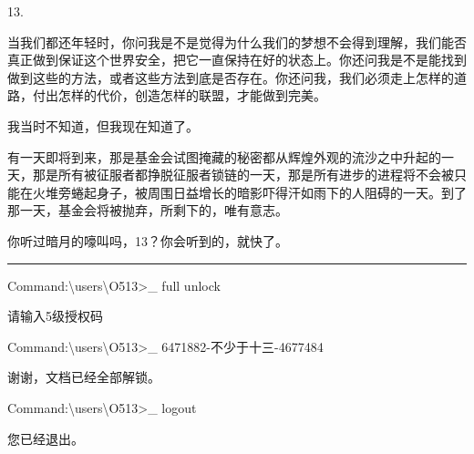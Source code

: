 \begin{scpboxbbwm}

13.

当我们都还年轻时，你问我是不是觉得为什么我们的梦想不会得到理解，我们能否真正做到保证这个世界安全，把它一直保持在好的状态上。你还问我是不是能找到做到这些的方法，或者这些方法到底是否存在。你还问我，我们必须走上怎样的道路，付出怎样的代价，创造怎样的联盟，才能做到完美。

我当时不知道，但我现在知道了。

有一天即将到来，那是基金会试图掩藏的秘密都从辉煌外观的流沙之中升起的一天，那是所有被征服者都挣脱征服者锁链的一天，那是所有进步的进程将不会被只能在火堆旁蜷起身子，被周围日益增长的暗影吓得汗如雨下的人阻碍的一天。到了那一天，基金会将被抛弃，所剩下的，唯有意志。

你听过暗月的嚎叫吗，13？你会听到的，就快了。


\end{scpboxbbwm}

\hrule


\begin{scpboxc}
Command:\textbackslash users\textbackslash O513>\_ full unlock
\end{scpboxc}


\begin{scpboxc}
请输入5级授权码
\end{scpboxc}


\begin{scpboxc}
Command:\textbackslash users\textbackslash O513>\_ 6471882-不少于十三-4677484
\end{scpboxc}


\begin{scpboxc}
谢谢，文档已经全部解锁。
\end{scpboxc}


\begin{scpboxc}
Command:\textbackslash users\textbackslash O513>\_ logout
\end{scpboxc}


\begin{scpboxc}
您已经退出。
\end{scpboxc}

\hr
